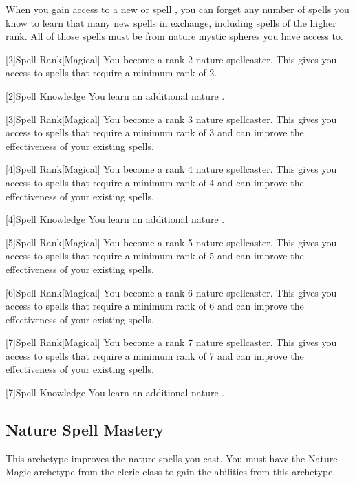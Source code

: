         When you gain access to a new  or spell ,
            you can forget any number of spells you know to learn that many new spells in exchange,
            including spells of the higher rank.
        All of those spells must be from nature mystic spheres you have access to.

        [2]{Spell Rank}[Magical] You become a rank 2 nature spellcaster.
        This gives you access to spells that require a minimum rank of 2.

        [2]{Spell Knowledge} You learn an additional nature .

        [3]{Spell Rank}[Magical] You become a rank 3 nature spellcaster.
        This gives you access to spells that require a minimum rank of 3 and can improve the effectiveness of your existing spells.

        [4]{Spell Rank}[Magical] You become a rank 4 nature spellcaster.
        This gives you access to spells that require a minimum rank of 4 and can improve the effectiveness of your existing spells.

        [4]{Spell Knowledge} You learn an additional nature .

        [5]{Spell Rank}[Magical] You become a rank 5 nature spellcaster.
        This gives you access to spells that require a minimum rank of 5 and can improve the effectiveness of your existing spells.

        [6]{Spell Rank}[Magical] You become a rank 6 nature spellcaster.
        This gives you access to spells that require a minimum rank of 6 and can improve the effectiveness of your existing spells.

        [7]{Spell Rank}[Magical] You become a rank 7 nature spellcaster.
        This gives you access to spells that require a minimum rank of 7 and can improve the effectiveness of your existing spells.

        [7]{Spell Knowledge} You learn an additional nature .

    \newpage
    \subsection{Nature Spell Mastery}
        This archetype improves the nature spells you cast.
        You must have the Nature Magic archetype from the cleric class to gain the abilities from this archetype.

